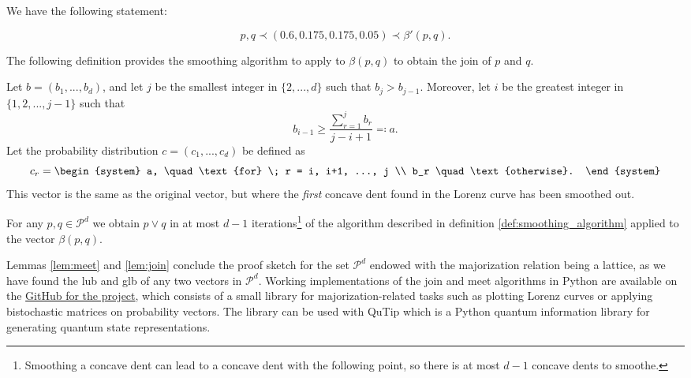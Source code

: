 \noindent We have the following statement:

\begin{equation}
    p, q \prec (0.6, 0.175, 0.175, 0.05) \prec \beta'(p, q).
\end{equation}

The following definition provides the smoothing algorithm to apply to $\beta(p, q)$ to obtain the join of $p$ and $q$.

\begin{definition} \label{def:smoothing_algorithm}
    Let $b = (b_1, ..., b_d)$, and let $j$ be the smallest integer in $\{2,...,d\}$ such that $b_j > b_{j-1}$. Moreover, let $i$ be the greatest integer in $\{1, 2, ..., j-1\}$ such that
    \begin{equation}
        b_{i-1} \geq \frac{\sum_{r=1}^{j}b_r}{j-i+1} \eqqcolon a.
    \end{equation}
    Let the probability distribution $c = (c_1, ..., c_d)$ be defined as
    \begin{equation}
        c_r = \begin{system}
                a, \quad \text{for} \; r = i, i+1, ..., j \\ %
                b_r \quad \text{otherwise}.
              \end{system}
    \end{equation}
    This vector is the same as the original vector, but where the \textit{first} concave dent found in the Lorenz curve has been smoothed out.
\end{definition}

\begin{lemma} \label{lem:join}
    For any $p, q \in \mathcal{P}^d$ we obtain $p \vee q$ in at most $d-1$ iterations\footnote{Smoothing a concave dent can lead to a concave dent with the following point, so there is at most $d-1$ concave dents to smoothe.} of the algorithm described in definition \ref{def:smoothing_algorithm} applied to the vector $\beta(p, q)$.
\end{lemma}

Lemmas \ref{lem:meet} and \ref{lem:join} conclude the proof sketch for the set $\mathcal{P}^d$ endowed with the majorization relation being a lattice, as we have found the lub and glb of any two vectors in $\mathcal{P}^d$. Working implementations of the join and meet algorithms in Python are available on the \href{https://github.com/traaldbjerg/MajoLat}{GitHub for the project}, which consists of a small library for majorization-related tasks such as plotting Lorenz curves or applying bistochastic matrices on probability vectors. The library can be used with QuTip which is a Python quantum information library for generating quantum state representations.


